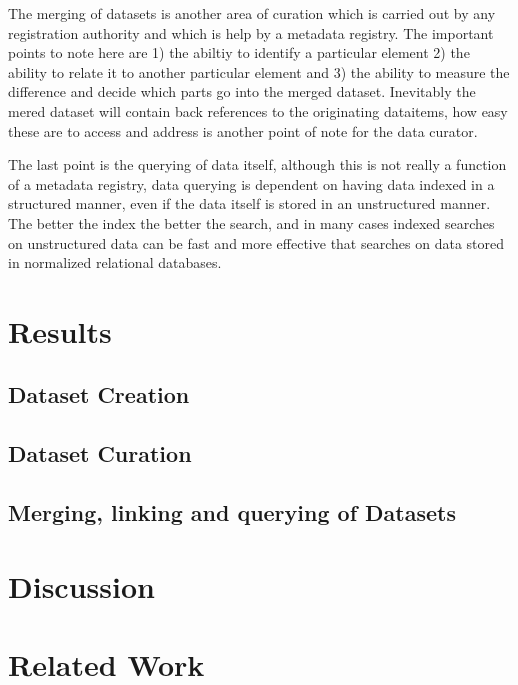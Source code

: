 \documentclass{llncs}
\begin{document}
The merging of datasets is another area of curation which is carried out by any registration authority and which is help by a metadata registry. The important points to note here are 1) the abiltiy to identify a particular element 2) the ability to relate it to another particular element and 3) the ability to measure the difference and decide which parts go into the merged dataset. Inevitably the mered dataset will contain back references to the originating dataitems, how easy these are to access and address is another point of note for the data curator.

The last point is the querying of data itself, although this is not really a function of a metadata registry, data querying is dependent on having data indexed in a structured manner, even if the data itself is stored in an unstructured manner. The better the index the better the search, and in many cases indexed searches on unstructured data can be fast and more effective that searches on data stored in normalized relational databases. 



\section{Results}

\subsection{Dataset Creation}





\subsection{Dataset Curation}





\subsection{Merging, linking and querying of Datasets}



\section{Discussion}

\section{Related Work}

 


\newpage




\end{document}
